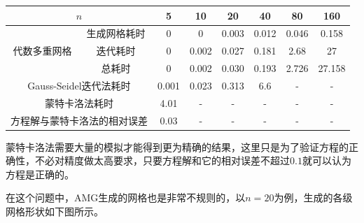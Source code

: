 \documentclass[lang=cn,10pt]{elegantbook}
\begin{document}
\begin{table}[H]
  \centering
  \begin{tabular}{cccccccc}
  \multicolumn{2}{c}{\textbf{$n$}}                                           & 5          & 10   & 20   & 40   & 80 & 160  \\ \hline
  \multicolumn{1}{c|}{\multirow{3}{*}{代数多重网格}} & \multicolumn{1}{c|}{生成网格耗时} & 0  & 0 & 0.003 & 0.012   & 0.046 & 0.158 \\
  \multicolumn{1}{c|}{}                        & \multicolumn{1}{c|}{迭代耗时}   & 0       & 0.002 & 0.027 & 0.181 & 2.68 & 27 \\
  \multicolumn{1}{c|}{}                        & \multicolumn{1}{c|}{总耗时}    & 0       & 0.002 & 0.030 & 0.193 & 2.726 & 27.158 \\ \cline{1-2}
  \multicolumn{2}{c|}{Gauss-Seidel迭代法耗时}                                                & 0.001 & 0.023 & 0.313 & 6.6 & - & - \\ \cline{1-2}
  \multicolumn{2}{c|}{蒙特卡洛法耗时}                                                   & 4.01  & - & -     & -     & -    & -\\ \cline{1-2}
  \multicolumn{2}{c|}{方程解与蒙特卡洛法的相对误差}                                    & 0.03  & - & -     & -     & -    & -
  \end{tabular}
\end{table}

蒙特卡洛法需要大量的模拟才能得到更为精确的结果，这里只是为了验证方程的正确性，不必对精度做太高要求，只要方程解和它的相对误差不超过$0.1$就可以认为方程是正确的。

在这个问题中，AMG生成的网格也是非常不规则的，以$n=20$为例，生成的各级网格形状如下图所示。
\end{document}
